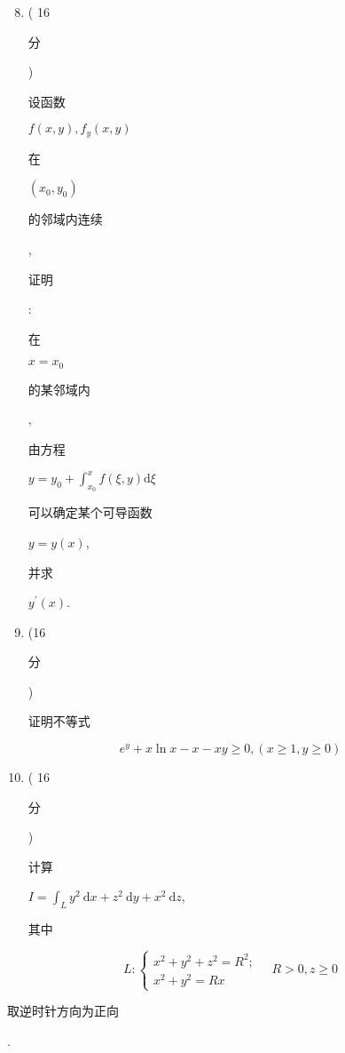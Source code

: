 \documentclass[10pt]{article}
\begin{document}
\begin{enumerate}
  \setcounter{enumi}{7}
  \item ( 16 \begin{CJK}{UTF8}{mj}分\end{CJK}) \begin{CJK}{UTF8}{mj}设函数\end{CJK} $f(x, y), f_{y}(x, y)$ \begin{CJK}{UTF8}{mj}在\end{CJK} $\left(x_{0}, y_{0}\right)$ \begin{CJK}{UTF8}{mj}的邻域内连续\end{CJK}, \begin{CJK}{UTF8}{mj}证明\end{CJK}: \begin{CJK}{UTF8}{mj}在\end{CJK} $x=x_{0}$ \begin{CJK}{UTF8}{mj}的某邻域内\end{CJK}, \begin{CJK}{UTF8}{mj}由方程\end{CJK} $y=y_{0}+\int_{x_{0}}^{x} f(\xi, y) \mathrm{d} \xi$ \begin{CJK}{UTF8}{mj}可以确定某个可导函数\end{CJK} $y=y(x)$, \begin{CJK}{UTF8}{mj}并求\end{CJK} $y^{\prime}(x)$.

  \item (16 \begin{CJK}{UTF8}{mj}分\end{CJK}) \begin{CJK}{UTF8}{mj}证明不等式\end{CJK}

\end{enumerate}
$$
e^{y}+x \ln x-x-x y \geqslant 0,(x \geqslant 1, y \geqslant 0)
$$

\begin{enumerate}
  \setcounter{enumi}{9}
  \item ( 16 \begin{CJK}{UTF8}{mj}分\end{CJK}) \begin{CJK}{UTF8}{mj}计算\end{CJK} $I=\int_{L} y^{2} \mathrm{~d} x+z^{2} \mathrm{~d} y+x^{2} \mathrm{~d} z$, \begin{CJK}{UTF8}{mj}其中\end{CJK}
\end{enumerate}
$$
L:\left\{\begin{array}{l}
x^{2}+y^{2}+z^{2}=R^{2} ; \\
x^{2}+y^{2}=R x
\end{array} \quad R>0, z \geqslant 0\right.
$$
\begin{CJK}{UTF8}{mj}取逆时针方向为正向\end{CJK}.
\end{document}
